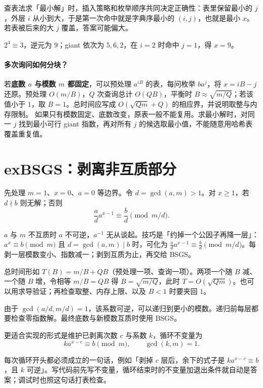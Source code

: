 \documentclass[UTF8,a4paper,11pt,oneside,openany,fontset=fandol]{ctexbook}
\theoremstyle{definition}
\begin{document}
\begin{tip}
查表法求「最小解」时，插入策略和枚举顺序共同决定正确性：表里保留最小的 $j$，外层 $i$ 从小到大，于是第一次命中就是字典序最小的 $(i,j)$，也就是最小 $x$。若表被后来的大 $j$ 覆盖，答案可能偏大。
\end{tip}

$2^4\equiv3$，逆元为 $9$；giant 依次为 $5,6,2$，在 $i=2$ 时命中 $j=1$，得 $x=9$。

\paragraph{多次询问如何分块？}
若\textbf{底数 $a$ 与模数 $m$ 都固定}，可以预处理 $a^{iB}$ 的表，每问枚举 $ba^j$，将 $x=iB-j$ 还原。预处理 $O(m/B)$，$Q$ 次查询总计 $O(QB)$，平衡时 $B\approx\sqrt{m/Q}$；若该值小于 $1$，取 $B=1$。总时间应写成 $O(\sqrt{Qm}+Q)$ 的相应界，并说明取整与内存限制。
如果只有模数固定、底数改变，原表一般不能复用。求最小解时，对同一 $j$ 找到最小可行 giant 指数，再对所有 $j$ 的候选取最小值，不能随意用哈希表覆盖重复值。


\section{exBSGS：剥离非互质部分}
先处理 $m=1$、$x=0$、$a=0$ 等边界。令 $d=\gcd(a,m)>1$。对 $x\ge1$，若 $d\nmid b$ 则无解；否则
\[
 \frac ad a^{x-1}\equiv\frac bd\pmod{m/d}.
\]

\begin{tip}
$a$ 与 $m$ 不互质时 $a$ 不可逆，$a^{-1}$ 无从谈起。技巧是「约掉一个公因子再降一层」：$a^x\equiv b\pmod m$ 且 $d=\gcd(a,m)\mid b$ 时，可化为 $\frac ad a^{x-1}\equiv\frac b d\pmod{m/d}$。每剥一层模数变小、指数减一；剥到互质为止，再交给 BSGS。
\end{tip}

\begin{tip}[「平衡」两个成本的做法]
总时间形如 $T(B)=m/B+QB$（预处理一项、查询一项）。两项一个随 $B$ 减、一个随 $B$ 增，令相等 $m/B=QB$ 得 $B=\sqrt{m/Q}$，此时 $T=O(\sqrt{Qm})$。也可以用求导验证；再检查取整、内存上限、以及 $B<1$ 时要夹回 $1$。
\end{tip}

由于 $\gcd(a/d,m/d)=1$，该系数可逆，可以递归到更小的模数。递归前每层都要检查零指数解。最终底数与新模数互质时使用 BSGS。


更适合实现的形式是维护已剥离次数 $c$ 与系数 $k$，循环不变量为
\[
 k a^{x-c}\equiv b\pmod m,\qquad\gcd(k,m)=1.
\]

\begin{tip}
每次循环开头都必须成立的一句话，例如「剥掉 $c$ 层后，余下的式子是 $ka^{x-c}\equiv b$，且 $k$ 可逆」。写代码前先写不变量，循环结束时的不变量加退出条件就自动是答案；调试时也照这句话打表检查。
\end{tip}
\end{document}

